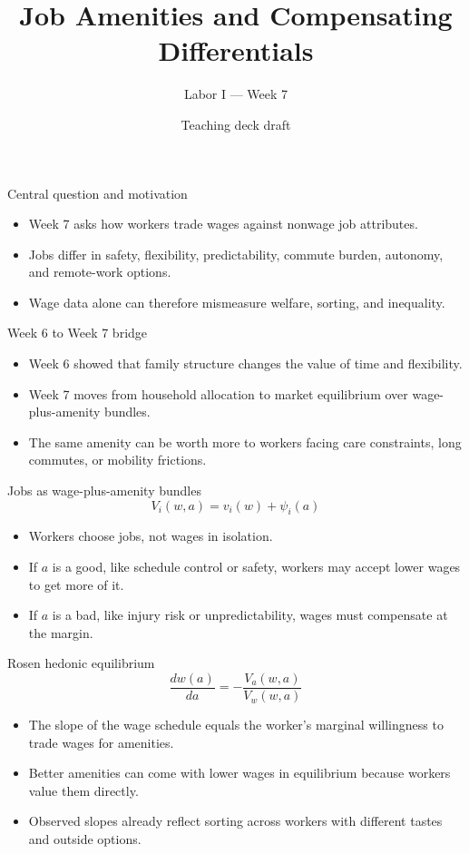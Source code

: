 \documentclass[aspectratio=169,11pt]{beamer}
\title{Job Amenities and Compensating Differentials}
\subtitle{Labor I --- Week 7}
\author{Teaching deck draft}
\date{}
\begin{document}
\begin{frame}
  \titlepage
\end{frame}

\begin{frame}{Central question and motivation}
\begin{itemize}
    \item Week 7 asks how workers trade wages against nonwage job attributes.
    \item Jobs differ in safety, flexibility, predictability, commute burden, autonomy, and remote-work options.
    \item Wage data alone can therefore mismeasure welfare, sorting, and inequality.
\end{itemize}
\end{frame}

\begin{frame}{Week 6 to Week 7 bridge}
\begin{itemize}
    \item Week 6 showed that family structure changes the value of time and flexibility.
    \item Week 7 moves from household allocation to market equilibrium over wage-plus-amenity bundles.
    \item The same amenity can be worth more to workers facing care constraints, long commutes, or mobility frictions.
\end{itemize}
\end{frame}

\begin{frame}{Jobs as wage-plus-amenity bundles}
\[
V_i(w, a) = v_i(w) + \psi_i(a)
\]

\begin{itemize}
    \item Workers choose jobs, not wages in isolation.
    \item If \(a\) is a good, like schedule control or safety, workers may accept lower wages to get more of it.
    \item If \(a\) is a bad, like injury risk or unpredictability, wages must compensate at the margin.
\end{itemize}
\end{frame}

\begin{frame}{Rosen hedonic equilibrium}
\[
\frac{dw(a)}{da} = - \frac{V_a(w, a)}{V_w(w, a)}
\]

\begin{itemize}
    \item The slope of the wage schedule equals the worker's marginal willingness to trade wages for amenities.
    \item Better amenities can come with lower wages in equilibrium because workers value them directly.
    \item Observed slopes already reflect sorting across workers with different tastes and outside options.
\end{itemize}
\end{frame}
\end{document}
